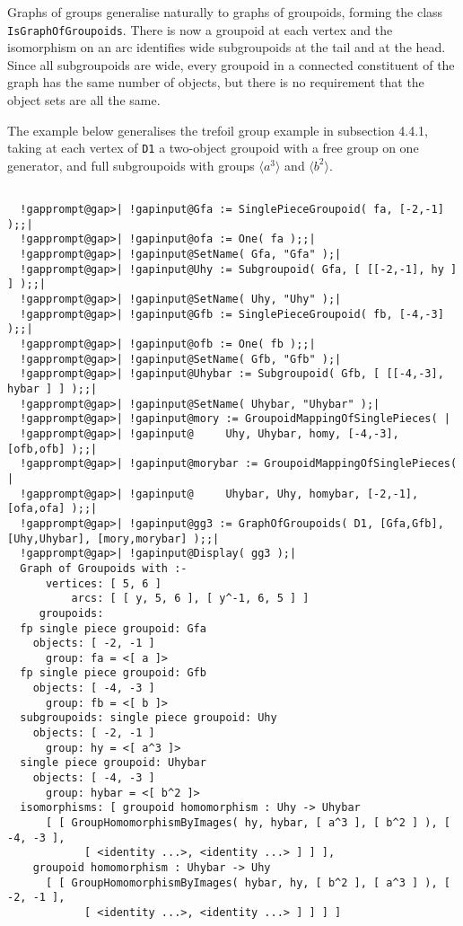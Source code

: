 \documentclass[a4paper,11pt]{report}
\begin{document}
{{{ Graphs of groups generalise naturally to graphs of groupoids, forming the
class \texttt{IsGraphOfGroupoids}. There is now a groupoid at each vertex and the isomorphism on an arc
identifies wide subgroupoids at the tail and at the head. Since all
subgroupoids are wide, every groupoid in a connected constituent of the graph
has the same number of objects, but there is no requirement that the object
sets are all the same. 

 The example below generalises the trefoil group example in subsection 4.4.1,
taking at each vertex of \texttt{D1} a two-object groupoid with a free group on one generator, and full
subgroupoids with groups $\langle a^3 \rangle$ and $\langle b^2 \rangle$. 

 }

 
\begin{Verbatim}[commandchars=!@|,fontsize=\small,frame=single,label=Example]
  
  !gapprompt@gap>| !gapinput@Gfa := SinglePieceGroupoid( fa, [-2,-1] );;|
  !gapprompt@gap>| !gapinput@ofa := One( fa );;|
  !gapprompt@gap>| !gapinput@SetName( Gfa, "Gfa" );|
  !gapprompt@gap>| !gapinput@Uhy := Subgroupoid( Gfa, [ [[-2,-1], hy ] ] );;|
  !gapprompt@gap>| !gapinput@SetName( Uhy, "Uhy" );|
  !gapprompt@gap>| !gapinput@Gfb := SinglePieceGroupoid( fb, [-4,-3] );;|
  !gapprompt@gap>| !gapinput@ofb := One( fb );;|
  !gapprompt@gap>| !gapinput@SetName( Gfb, "Gfb" );|
  !gapprompt@gap>| !gapinput@Uhybar := Subgroupoid( Gfb, [ [[-4,-3], hybar ] ] );;|
  !gapprompt@gap>| !gapinput@SetName( Uhybar, "Uhybar" );|
  !gapprompt@gap>| !gapinput@mory := GroupoidMappingOfSinglePieces( |
  !gapprompt@gap>| !gapinput@     Uhy, Uhybar, homy, [-4,-3], [ofb,ofb] );;|
  !gapprompt@gap>| !gapinput@morybar := GroupoidMappingOfSinglePieces( |
  !gapprompt@gap>| !gapinput@     Uhybar, Uhy, homybar, [-2,-1], [ofa,ofa] );;|
  !gapprompt@gap>| !gapinput@gg3 := GraphOfGroupoids( D1, [Gfa,Gfb], [Uhy,Uhybar], [mory,morybar] );;|
  !gapprompt@gap>| !gapinput@Display( gg3 );|
  Graph of Groupoids with :- 
      vertices: [ 5, 6 ]
          arcs: [ [ y, 5, 6 ], [ y^-1, 6, 5 ] ]
     groupoids: 
  fp single piece groupoid: Gfa
    objects: [ -2, -1 ]
      group: fa = <[ a ]>
  fp single piece groupoid: Gfb
    objects: [ -4, -3 ]
      group: fb = <[ b ]>
  subgroupoids: single piece groupoid: Uhy
    objects: [ -2, -1 ]
      group: hy = <[ a^3 ]>
  single piece groupoid: Uhybar
    objects: [ -4, -3 ]
      group: hybar = <[ b^2 ]>
  isomorphisms: [ groupoid homomorphism : Uhy -> Uhybar
      [ [ GroupHomomorphismByImages( hy, hybar, [ a^3 ], [ b^2 ] ), [ -4, -3 ], 
            [ <identity ...>, <identity ...> ] ] ], 
    groupoid homomorphism : Uhybar -> Uhy
      [ [ GroupHomomorphismByImages( hybar, hy, [ b^2 ], [ a^3 ] ), [ -2, -1 ], 
            [ <identity ...>, <identity ...> ] ] ] ]
  

\end{Verbatim}}}
\end{document}
